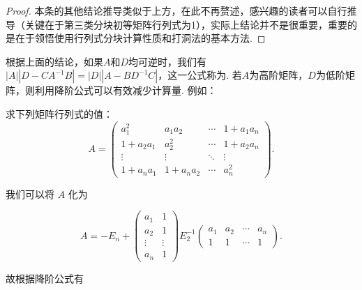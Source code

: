 \begin{enumerate}
\begin{proof}
              本条的其他结论推导类似于上方，在此不再赘述，感兴趣的读者可以自行推导（关键在于第三类分块初等矩阵行列式为1），实际上结论并不是很重要，重要的是在于领悟使用行列式分块计算性质和打洞法的基本方法.
          \end{proof}

          根据上面的结论，如果$A$和$D$均可逆时，我们有$|A||D-CA^{-1}B|=|D||A-BD^{-1}C|$，这一公式称为. 若$A$为高阶矩阵，$D$为低阶矩阵，则利用降阶公式可以有效减少计算量. 例如：

          \begin{example}{}{}
              求下列矩阵行列式的值：
              \[A=\begin{pmatrix}
                      a_1^2    & a_1a_2   & \cdots & 1+a_1a_n \\
                      1+a_2a_1 & a_2^2    & \cdots & 1+a_2a_n \\
                      \vdots   & \vdots   & \ddots & \vdots   \\
                      1+a_na_1 & 1+a_na_2 & \cdots & a_n^2
                  \end{pmatrix}.\]
          \end{example}

          \begin{solution}
              我们可以将 $A$ 化为

              \[ A = -E_n + \begin{pmatrix}
                      a_1 & 1 \\ a_2 & 1 \\ \vdots & \vdots \\ a_n & 1
                  \end{pmatrix} E_2^{-1} \begin{pmatrix}
                      a_1 & a_2 & \cdots & a_n \\ 1 & 1 & \cdots & 1
                  \end{pmatrix}. \]

              故根据降阶公式有


\end{solution}
\end{enumerate}
